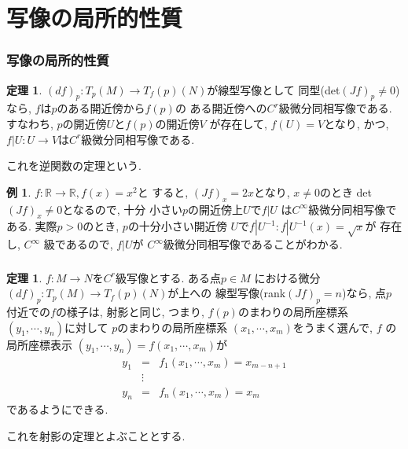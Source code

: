 \documentclass[dvipdfmx,cjk]{beamer}
\theoremstyle{definition}
\newtheorem{ex}{\textbf{ 例 }}
\newtheorem{thm}[dfn]{\textbf{ 定理 }}
\begin{document}
\section{写像の局所的性質}
\begin{frame}
  \frametitle{写像の局所的性質}
  \begin{thm}\label{theo:f^(-1)theorem}
    $(df)_p:T_p(M)\to T_f(p)(N)$が線型写像として
    同型(det$(Jf)_p\neq 0$)なら, $f$は$p$のある開近傍から$f(p)$の
    ある開近傍への$C^r$級微分同相写像である. 
    すなわち, $p$の開近傍$U$と$f(p)$の開近傍$V$
    が存在して, $f(U)=V$となり, かつ, 
    $f|U:U \to V$は$C^r$級微分同相写像である. 
  \end{thm}
  これを逆関数の定理という. 
  \begin{ex}
    $f:\mathbb{R}\to \mathbb{R}, f(x)=x^2$と
    すると, $(Jf)_x=2x$となり, $x\neq 0$のとき
    det$(Jf)_x\neq 0$となるので, 十分
    小さい$p$の開近傍上$U$で$f|U$
    は$C^\infty$級微分同相写像である. 
    実際$p>0$のとき, $p$の十分小さい開近傍
    $U$で$f|U^{-1}:
    f|U^{-1}(x)=\sqrt{x}$が
    存在し, $C^\infty$
    級であるので, $f|U$が
    $C^\infty$級微分同相写像であることがわかる.
  \end{ex}
\end{frame}

\begin{frame}
  \frametitle{}
  \begin{thm}\label{theo: projection theorem}
    $f:M\to N$を$C^r$級写像とする. ある点$p\in M$
    における微分$(df)_p:T_p(M)\to T_f(p)(N)$が上への
    線型写像(rank$(Jf)_p=n$)なら, 点$p$付近での$f$の様子は,
    射影と同じ, つまり, $f(p)$のまわりの局所座標系
    $(y_1, \cdots ,y_n)$に対して
    $p$のまわりの局所座標系
    $(x_1,\cdots ,x_m)$をうまく選んで, $f$
    の局所座標表示
    $(y_1, \cdots ,y_n)=f(x_1,\cdots,x_m)$が
    \begin{eqnarray*}
        y_1&=&f_1(x_1,\cdots ,x_m)=x_{m-n+1}\\
        &\vdots& \\
        y_n&=&f_n(x_1,\cdots ,x_m)=x_m
    \end{eqnarray*}
    であるようにできる. 
  \end{thm}
  これを射影の定理とよぶこととする. 
\end{frame}
\end{document}
